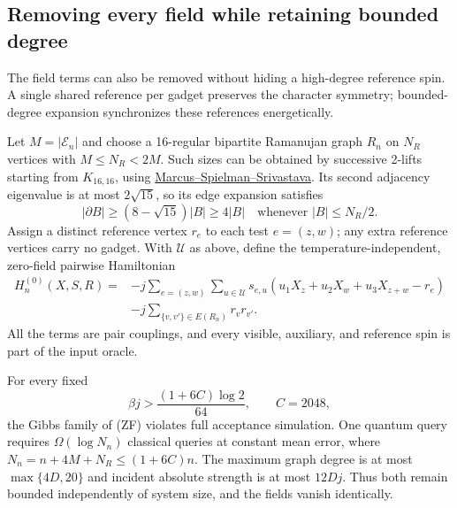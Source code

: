 \subsection{Removing every field while retaining bounded degree}
\label{res:zero-field}

The field terms can also be removed without hiding a high-degree
reference spin.  A single shared reference per gadget preserves the
character symmetry; bounded-degree expansion synchronizes these
references energetically.

Let $M=|\mathcal E_n|$ and choose a 16-regular bipartite Ramanujan
graph $R_n$ on $N_R$ vertices with $M\le N_R<2M$.  Such sizes can
be obtained by successive 2-lifts starting from $K_{16,16}$, using
\href{https://arxiv.org/abs/1304.4132}{Marcus--Spielman--Srivastava}.
Its second adjacency eigenvalue is at most $2\sqrt{15}$, so its edge
expansion satisfies
\[
 |\partial B|\ge(8-\sqrt{15})|B|\ge4|B|
 \quad\text{whenever }|B|\le N_R/2.
\]
Assign a distinct reference vertex $r_e$ to each test $e=(z,w)$; any
extra reference vertices carry no gadget.  With $\mathcal U$ as above,
define the temperature-independent, zero-field pairwise Hamiltonian
\[
 \begin{split}
 H^{(0)}_n(X,S,R)={}&
 -j\sum_{e=(z,w)}\sum_{u\in\mathcal U}s_{e,u}
       (u_1X_z+u_2X_w+u_3X_{z+w}-r_e)\\
 &-j\sum_{\{v,v'\}\in E(R_n)}r_vr_{v'}.
 \end{split}
 \tag{ZF}
\]
All the terms are pair couplings, and every visible, auxiliary, and
reference spin is part of the input oracle.

\begin{theorem}
\label{res:zero-field-theorem}
For every fixed
\[
 \beta j>\frac{(1+6C)\log2}{64},\qquad C=2048,
\]
the Gibbs family of (ZF) violates full acceptance simulation.  One
quantum query requires $\Omega(\log N_n)$ classical queries at
constant mean error, where $N_n=n+4M+N_R\le(1+6C)n$.  The maximum
graph degree is at most $\max\{4D,20\}$ and incident absolute
strength is at most $12Dj$.  Thus both remain bounded independently
of system size, and the fields vanish identically.
\end{theorem}


